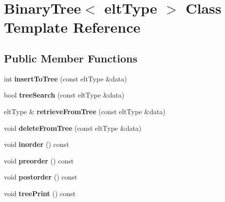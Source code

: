 \hypertarget{classBinaryTree}{\section{Binary\-Tree$<$ elt\-Type $>$ Class Template Reference}
\label{classBinaryTree}
}
\subsection*{Public Member Functions}
\begin{DoxyCompactItemize}
\item 
\hypertarget{classBinaryTree_a2b81eef96e974b01ce340535a7cab353}{int {\bfseries insert\-To\-Tree} (const elt\-Type \&data)}\label{classBinaryTree_a2b81eef96e974b01ce340535a7cab353}

\item 
\hypertarget{classBinaryTree_a67cf4e7630dd7be6bc986892beea8835}{bool {\bfseries tree\-Search} (const elt\-Type \&data)}\label{classBinaryTree_a67cf4e7630dd7be6bc986892beea8835}

\item 
\hypertarget{classBinaryTree_ad0a57468737c049c56433773b684e826}{elt\-Type \& {\bfseries retrieve\-From\-Tree} (const elt\-Type \&data)}\label{classBinaryTree_ad0a57468737c049c56433773b684e826}

\item 
\hypertarget{classBinaryTree_ac55750f02c678c6b1147130e78528276}{void {\bfseries delete\-From\-Tree} (const elt\-Type \&data)}\label{classBinaryTree_ac55750f02c678c6b1147130e78528276}

\item 
\hypertarget{classBinaryTree_a2259d8f05d66e5bba8403c49755e3df3}{void {\bfseries inorder} () const }\label{classBinaryTree_a2259d8f05d66e5bba8403c49755e3df3}

\item 
\hypertarget{classBinaryTree_a9ebced48d15bca2b17d02f72544c3c2c}{void {\bfseries preorder} () const }\label{classBinaryTree_a9ebced48d15bca2b17d02f72544c3c2c}

\item 
\hypertarget{classBinaryTree_ab388d9dfd96d5ec1887fbd8b35287081}{void {\bfseries postorder} () const }\label{classBinaryTree_ab388d9dfd96d5ec1887fbd8b35287081}

\item 
\hypertarget{classBinaryTree_a6edf74611ead442a24510837c6a1b741}{void {\bfseries tree\-Print} () const }\label{classBinaryTree_a6edf74611ead442a24510837c6a1b741}

\end{DoxyCompactItemize}

